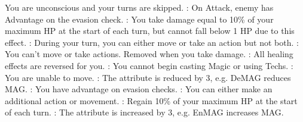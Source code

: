 \documentclass[a4paper, titlepage, 11pt, twocolumn] {article}
\begin{document}
{\begin{multicols}{2}
{		\kosmall{} You are unconscious and your turns are skipped.\ofrow
		\blindsmall{}: On Attack, enemy has Advantage on the evasion check. \ofrow
		\poisonsmall{}: You take damage equal to 10\% of your maximum HP at the start of each turn, but cannot fall below 1 HP due to this effect.\ofrow
		\slowsmall{}: During your turn, you can either move or take an action but not both.\ofrow
		\sleepsmall{}: You can't move or take actions. Removed when you take damage.\ofrow
		\zombiesmall{}: All healing effects are reversed for you.\ofrow
		\silencesmall{}: You cannot begin casting Magic or using Techs.\ofrow
		\immobilesmall{}: You are unable to move. \ofrow
		\destrsmall\dedefsmall\demagsmall\deressmall{}: The attribute is reduced by 3, e.g. DeMAG reduces MAG. \ofrow
		\blinksmall{}: You have advantage on evasion checks. \ofrow
		\hastesmall{}: You can either make an additional action or movement. \ofrow
		\regensmall{}: Regain 10\% of your maximum HP at the start of each turn.\ofrow
		\enstrsmall\enndefsmall\enmagsmall\enressmall{}: The attribute is increased by 3, e.g. EnMAG increases MAG. \ofrow
	}
	\end{multicols}
}
\end{document}

